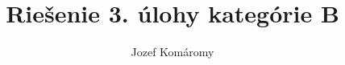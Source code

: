 \documentclass{article}
\begin{document}
\title{Riešenie 3. úlohy kategórie B}
\author{Jozef Komáromy}

\maketitle
\end{document}
